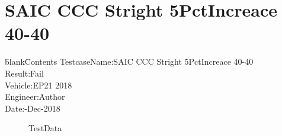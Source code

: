 \documentclass[12pt]{report}
\begin{document}
\section{SAIC CCC Stright 5PctIncreace 40-40} 
\begin{CJK}{GBK}{kai} 
\begin{tabbing} 
\hspace*{40bp}\=blank\hspace*{80bp}\=Contents\kill 
 \>TestcaseName:\>SAIC CCC Stright 5PctIncreace 40-40\\ 
 \>Result:\>Fail\\ 
 \>Vehicle:\>EP21 2018\\ 
 \>Engineer:\>Author\\ 
 \>Date:-Dec-2018\\ 
\end{tabbing} 
\end{CJK} 
\label{w2} 
\begin{figure}[h!]  
\centering  
{} 
 
\caption{TestData} 
\end{figure} 
\newpage 
\end{document}
